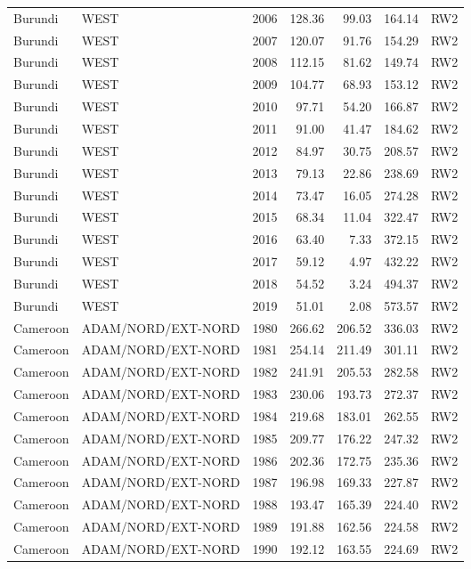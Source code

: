 \begin{longtable}{lllrrrl}
  Burundi & WEST & 2006 & 128.36 & 99.03 & 164.14 & RW2 \\ 
  Burundi & WEST & 2007 & 120.07 & 91.76 & 154.29 & RW2 \\ 
  Burundi & WEST & 2008 & 112.15 & 81.62 & 149.74 & RW2 \\ 
  Burundi & WEST & 2009 & 104.77 & 68.93 & 153.12 & RW2 \\ 
  Burundi & WEST & 2010 & 97.71 & 54.20 & 166.87 & RW2 \\ 
  Burundi & WEST & 2011 & 91.00 & 41.47 & 184.62 & RW2 \\ 
  Burundi & WEST & 2012 & 84.97 & 30.75 & 208.57 & RW2 \\ 
  Burundi & WEST & 2013 & 79.13 & 22.86 & 238.69 & RW2 \\ 
  Burundi & WEST & 2014 & 73.47 & 16.05 & 274.28 & RW2 \\ 
  Burundi & WEST & 2015 & 68.34 & 11.04 & 322.47 & RW2 \\ 
  Burundi & WEST & 2016 & 63.40 & 7.33 & 372.15 & RW2 \\ 
  Burundi & WEST & 2017 & 59.12 & 4.97 & 432.22 & RW2 \\ 
  Burundi & WEST & 2018 & 54.52 & 3.24 & 494.37 & RW2 \\ 
  Burundi & WEST & 2019 & 51.01 & 2.08 & 573.57 & RW2 \\ 
  Cameroon & ADAM/NORD/EXT-NORD & 1980 & 266.62 & 206.52 & 336.03 & RW2 \\ 
  Cameroon & ADAM/NORD/EXT-NORD & 1981 & 254.14 & 211.49 & 301.11 & RW2 \\ 
  Cameroon & ADAM/NORD/EXT-NORD & 1982 & 241.91 & 205.53 & 282.58 & RW2 \\ 
  Cameroon & ADAM/NORD/EXT-NORD & 1983 & 230.06 & 193.73 & 272.37 & RW2 \\ 
  Cameroon & ADAM/NORD/EXT-NORD & 1984 & 219.68 & 183.01 & 262.55 & RW2 \\ 
  Cameroon & ADAM/NORD/EXT-NORD & 1985 & 209.77 & 176.22 & 247.32 & RW2 \\ 
  Cameroon & ADAM/NORD/EXT-NORD & 1986 & 202.36 & 172.75 & 235.36 & RW2 \\ 
  Cameroon & ADAM/NORD/EXT-NORD & 1987 & 196.98 & 169.33 & 227.87 & RW2 \\ 
  Cameroon & ADAM/NORD/EXT-NORD & 1988 & 193.47 & 165.39 & 224.40 & RW2 \\ 
  Cameroon & ADAM/NORD/EXT-NORD & 1989 & 191.88 & 162.56 & 224.58 & RW2 \\ 
  Cameroon & ADAM/NORD/EXT-NORD & 1990 & 192.12 & 163.55 & 224.69 & RW2 \\ 

\end{longtable}
